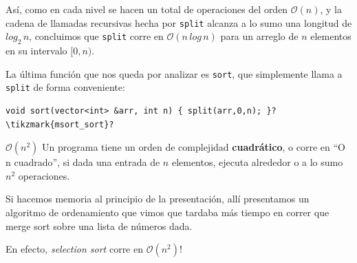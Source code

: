 \documentclass{beamer}
\begin{document}
\begin{frame}
\begin{center}
{
            }
            \end{center}

        \pause

        Así, como en cada nivel se hacen un total de operaciones del orden $\mathcal{O}(n)$, y la cadena de llamadas recursivas hecha por \texttt{split} alcanza a lo sumo una longitud de $log_2 \, n$, concluimos que \texttt{split} corre en $\mathcal{O}(n \, log \, n)$ para un arreglo de $n$ elementos en su intervalo $[0,n)$. \pause \vspace{4pt}

        La última función que nos queda por analizar es \texttt{sort}, que simplemente llama a \texttt{split} de forma conveniente: \pause

        \begin{verbatim}
void sort(vector<int> &arr, int n) { split(arr,0,n); }?\tikzmark{msort_sort}?
        \end{verbatim}
        \pause
        \vspace{-8pt}
    \end{frame}


    \begin{frame}{$\mathcal{O}(n^2)$}
        Un programa tiene un orden de complejidad \textbf{cuadrático}, o corre en ``O n cuadrado'', si dada una entrada de $n$ elementos, ejecuta alrededor o a lo sumo $n^2$ operaciones. \pause \vspace{8pt}

        Si hacemos memoria al principio de la presentación, allí presentamos un algoritmo de ordenamiento que vimos que tardaba más tiempo en correr que merge sort sobre una lista de números dada. \pause 

        En efecto, \textit{selection sort} corre en $\mathcal{O}(n^2)$!
    \end{frame}
\end{document}
